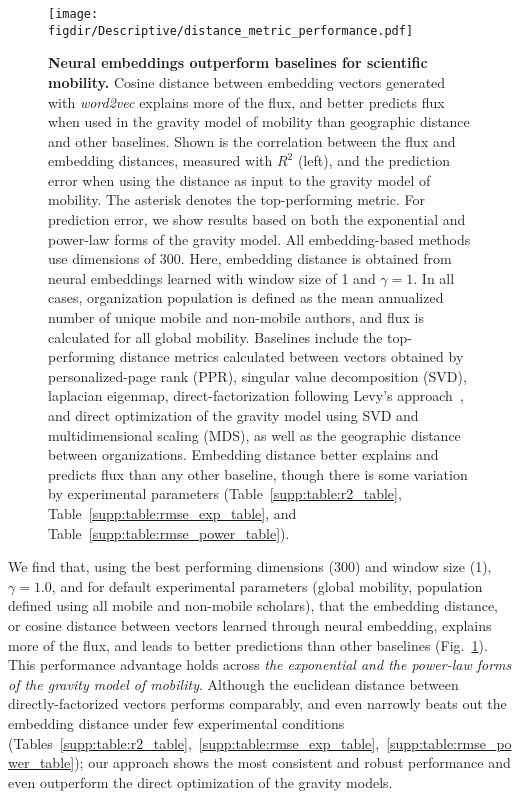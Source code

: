 \documentclass[12pt,a4paper]{article}
\def\figdir{../Figs}
\newcommand{\mycaption}[2]{%
  \caption[#1]{\textbf{#1} \small#2}%
}
\begin{document}
%
%
\begin{figure}[ht!]
	\centering
	\texttt{[image: \\figdir/Descriptive/distance\_metric\_performance.pdf]}
	\mycaption
	{Neural embeddings outperform baselines for scientific mobility.}
	{
		Cosine distance between embedding vectors generated with \textit{word2vec} explains more of the flux, and better predicts flux when used in the gravity model of mobility than geographic distance and other baselines.
		Shown is the correlation between the flux and embedding distances, measured with $R^{2}$ (left), and the prediction error when using the distance as input to the gravity model of mobility.
		The asterisk denotes the top-performing metric.
		For prediction error, we show results based on both the exponential and power-law forms of the gravity model.
		All embedding-based methods use dimensions of 300.
		Here, embedding distance is obtained from neural embeddings learned with window size of 1 and $\gamma = 1$.
		In all cases, organization population is defined as the mean annualized number of unique mobile and non-mobile authors, and flux is calculated for all global mobility.
		Baselines include the top-performing distance metrics calculated between vectors obtained by personalized-page rank (PPR), singular value decomposition (SVD), laplacian eigenmap, direct-factorization following Levy's approach~\autocite{levy2014neural}, and direct optimization of the gravity model using SVD and multidimensional scaling (MDS), as well as the geographic distance between organizations.
		Embedding distance better explains and predicts flux than any other baseline, though there is some variation by experimental parameters (Table~\ref{supp:table:r2_table}, Table~\ref{supp:table:rmse_exp_table}, and Table~\ref{supp:table:rmse_power_table}).
	}
	\label{fig:supp:distancemetrics}
\end{figure}


We find that, using the best performing dimensions (300) and window size (1),  $\gamma = 1.0$, and for default experimental parameters (global mobility, population defined using all mobile and non-mobile scholars), that the embedding distance, or cosine distance between vectors learned through neural embedding, explains more of the flux, and leads to better predictions than other baselines (Fig.~\ref{fig:supp:distancemetrics}).
This performance advantage holds across \emph{the exponential and the power-law forms of the gravity model of mobility}.
Although the euclidean distance between directly-factorized vectors performs comparably, and even narrowly beats out the embedding distance under few experimental conditions (Tables~\ref{supp:table:r2_table},~\ref{supp:table:rmse_exp_table},~\ref{supp:table:rmse_power_table}); our approach shows the most consistent and robust performance and even outperform the direct optimization of the gravity models.
\end{document}

